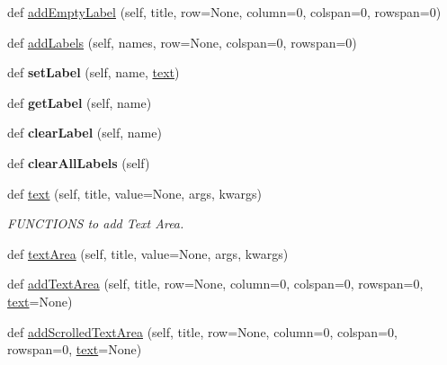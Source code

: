 \begin{DoxyCompactItemize}
\item 
def \hyperlink{class_python_01_g_u_i_1_1appjar_1_1gui_a108b3e754e0c227a7041d756b4fea3c6}{add\+Empty\+Label} (self, title, row=None, column=0, colspan=0, rowspan=0)
\item 
def \hyperlink{class_python_01_g_u_i_1_1appjar_1_1gui_aa2cac3a6dba1fccfc7d30f3b3c55ba93}{add\+Labels} (self, names, row=None, colspan=0, rowspan=0)
\item 
\mbox{\label{class_python_01_g_u_i_1_1appjar_1_1gui_a8ed0c5a762ab56b0f38a96e2654d0f35}} 
def {\bfseries set\+Label} (self, name, \hyperlink{class_python_01_g_u_i_1_1appjar_1_1gui_a6a060ddfec169e464326a0dd179a559e}{text})
\item 
\mbox{\label{class_python_01_g_u_i_1_1appjar_1_1gui_a6f8a16d7deef9fe9f44308c375f14881}} 
def {\bfseries get\+Label} (self, name)
\item 
\mbox{\label{class_python_01_g_u_i_1_1appjar_1_1gui_a1217f852a059153a1764cce69cdffcc0}} 
def {\bfseries clear\+Label} (self, name)
\item 
\mbox{\label{class_python_01_g_u_i_1_1appjar_1_1gui_a72e98ea14b1afb0070be36022c81c45b}} 
def {\bfseries clear\+All\+Labels} (self)
\item 
def \hyperlink{class_python_01_g_u_i_1_1appjar_1_1gui_a6a060ddfec169e464326a0dd179a559e}{text} (self, title, value=None, args, kwargs)
\begin{DoxyCompactList}\small\item\em F\+U\+N\+C\+T\+I\+O\+NS to add Text Area. \end{DoxyCompactList}\item 
def \hyperlink{class_python_01_g_u_i_1_1appjar_1_1gui_ad290b6f726cd655f75322e10ef232c05}{text\+Area} (self, title, value=None, args, kwargs)
\item 
def \hyperlink{class_python_01_g_u_i_1_1appjar_1_1gui_a49054304ee257e29b47c61261f277005}{add\+Text\+Area} (self, title, row=None, column=0, colspan=0, rowspan=0, \hyperlink{class_python_01_g_u_i_1_1appjar_1_1gui_a6a060ddfec169e464326a0dd179a559e}{text}=None)
\item 
def \hyperlink{class_python_01_g_u_i_1_1appjar_1_1gui_aeed9dcabd10845ff85b0fe079672b015}{add\+Scrolled\+Text\+Area} (self, title, row=None, column=0, colspan=0, rowspan=0, \hyperlink{class_python_01_g_u_i_1_1appjar_1_1gui_a6a060ddfec169e464326a0dd179a559e}{text}=None)

\end{DoxyCompactItemize}
